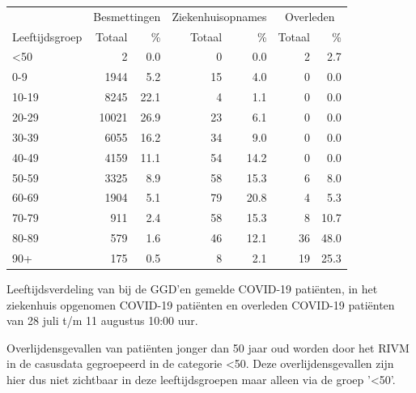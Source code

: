 \documentclass[
  english,
  man,floatsintext]{apa6}
\begin{document}
\begin{table}
\centering\begingroup\fontsize{11}{13}\selectfont

\begin{threeparttable}
\begin{tabular}{lrrrrrr}
\toprule
\multicolumn{1}{c}{ } & \multicolumn{2}{c}{Besmettingen} & \multicolumn{2}{c}{Ziekenhuisopnames} & \multicolumn{2}{c}{Overleden} \\
\cmidrule(l{3pt}r{3pt}){2-3} \cmidrule(l{3pt}r{3pt}){4-5} \cmidrule(l{3pt}r{3pt}){6-7}
Leeftijdsgroep & Totaal & \% & Totaal & \% & Totaal & \%\\
\midrule
<50 & 2 & 0.0 & 0 & 0.0 & 2 & 2.7\\
0-9 & 1944 & 5.2 & 15 & 4.0 & 0 & 0.0\\
10-19 & 8245 & 22.1 & 4 & 1.1 & 0 & 0.0\\
20-29 & 10021 & 26.9 & 23 & 6.1 & 0 & 0.0\\
30-39 & 6055 & 16.2 & 34 & 9.0 & 0 & 0.0\\
40-49 & 4159 & 11.1 & 54 & 14.2 & 0 & 0.0\\
50-59 & 3325 & 8.9 & 58 & 15.3 & 6 & 8.0\\
60-69 & 1904 & 5.1 & 79 & 20.8 & 4 & 5.3\\
70-79 & 911 & 2.4 & 58 & 15.3 & 8 & 10.7\\
80-89 & 579 & 1.6 & 46 & 12.1 & 36 & 48.0\\
90+ & 175 & 0.5 & 8 & 2.1 & 19 & 25.3\\
\bottomrule
\end{tabular}
\begin{tablenotes}
\item[1] Leeftijdsverdeling van bij de GGD’en gemelde COVID-19 patiënten, in het ziekenhuis opgenomen COVID-19 patiënten en overleden COVID-19 patiënten van 28 juli t/m 11 augustus 10:00 uur.
\item[2] Overlijdensgevallen van patiënten jonger dan 50 jaar oud worden door het RIVM in de casusdata gegroepeerd in de categorie <50. Deze overlijdensgevallen zijn hier dus niet zichtbaar in deze leeftijdsgroepen maar alleen via de groep '<50'.
\end{tablenotes}
\end{threeparttable}
\endgroup{}
\end{table}

\newpage
\end{document}
